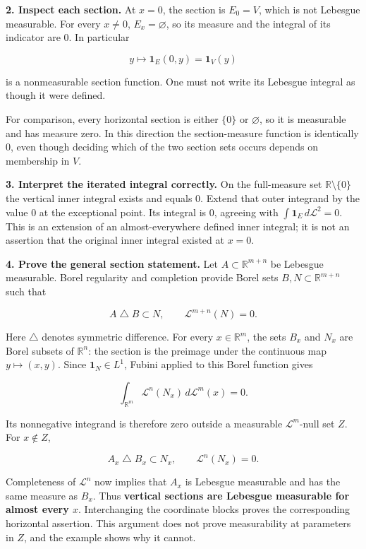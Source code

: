 \documentclass[
  11pt,
]{article}
\begin{document}
\textbf{2. Inspect each section.} At \(x=0\), the section is \(E_0=V\),
which is not Lebesgue measurable. For every \(x\ne0\),
\(E_x=\varnothing\), so its measure and the integral of its indicator
are \(0\). In particular

\[
y\longmapsto\mathbf 1_E(0,y)=\mathbf 1_V(y)
\]

is a nonmeasurable section function. One must not write its Lebesgue
integral as though it were defined.

For comparison, every horizontal section is either \(\{0\}\) or
\(\varnothing\), so it is measurable and has measure zero. In this
direction the section-measure function is identically \(0\), even though
deciding which of the two section sets occurs depends on membership in
\(V\).

\textbf{3. Interpret the iterated integral correctly.} On the
full-measure set \(\mathbb R\setminus\{0\}\) the vertical inner integral
exists and equals \(0\). Extend that outer integrand by the value \(0\)
at the exceptional point. Its integral is \(0\), agreeing with
\(\int\mathbf 1_E\,d\mathcal L^2=0\). This is an extension of an
almost-everywhere defined inner integral; it is not an assertion that
the original inner integral existed at \(x=0\).

\textbf{4. Prove the general section statement.} Let
\(A\subset\mathbb R^{m+n}\) be Lebesgue measurable. Borel regularity and
completion provide Borel sets \(B,N\subset\mathbb R^{m+n}\) such that

\[
A\mathbin{\triangle}B\subset N,
\qquad \mathcal L^{m+n}(N)=0.
\]

Here \(\triangle\) denotes symmetric difference. For every
\(x\in\mathbb R^m\), the sets \(B_x\) and \(N_x\) are Borel subsets of
\(\mathbb R^n\): the section is the preimage under the continuous map
\(y\mapsto(x,y)\). Since \(\mathbf 1_N\in L^1\), Fubini applied to this
Borel function gives

\[
\int_{\mathbb R^m}\mathcal L^n(N_x)\,d\mathcal L^m(x)=0.
\]

Its nonnegative integrand is therefore zero outside a measurable
\(\mathcal L^m\)-null set \(Z\). For \(x\notin Z\),

\[
A_x\mathbin{\triangle}B_x\subset N_x,
\qquad \mathcal L^n(N_x)=0.
\]

Completeness of \(\mathcal L^n\) now implies that \(A_x\) is Lebesgue
measurable and has the same measure as \(B_x\). Thus \textbf{vertical
sections are Lebesgue measurable for almost every \(x\)}. Interchanging
the coordinate blocks proves the corresponding horizontal assertion.
This argument does not prove measurability at parameters in \(Z\), and
the example shows why it cannot.
\end{document}
